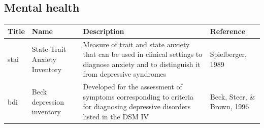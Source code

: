 \documentclass[]{book}
\begin{document}
\hypertarget{mental-health}{%
\subsection{Mental health}\label{mental-health}}

\begin{longtable}[]{@{}llll@{}}
\toprule
\begin{minipage}[b]{0.22\columnwidth}\raggedright
Title\strut
\end{minipage} & \begin{minipage}[b]{0.27\columnwidth}\raggedright
Name\strut
\end{minipage} & \begin{minipage}[b]{0.22\columnwidth}\raggedright
Description\strut
\end{minipage} & \begin{minipage}[b]{0.18\columnwidth}\raggedright
Reference\strut
\end{minipage}\tabularnewline
\midrule
\endhead
\begin{minipage}[t]{0.22\columnwidth}\raggedright
stai\strut
\end{minipage} & \begin{minipage}[t]{0.27\columnwidth}\raggedright
State-Trait Anxiety Inventory\strut
\end{minipage} & \begin{minipage}[t]{0.22\columnwidth}\raggedright
Measure of trait and state anxiety that can be used in clinical settings to diagnose anxiety and to distinguish it from depressive syndromes\strut
\end{minipage} & \begin{minipage}[t]{0.18\columnwidth}\raggedright
Spielberger, 1989\strut
\end{minipage}\tabularnewline
\begin{minipage}[t]{0.22\columnwidth}\raggedright
bdi\strut
\end{minipage} & \begin{minipage}[t]{0.27\columnwidth}\raggedright
Beck depression inventory\strut
\end{minipage} & \begin{minipage}[t]{0.22\columnwidth}\raggedright
Developed for the assessment of symptoms corresponding to criteria for diagnosing depressive disorders listed in the DSM IV\strut
\end{minipage} & \begin{minipage}[t]{0.18\columnwidth}\raggedright
Beck, Steer, \& Brown, 1996\strut
\end{minipage}\tabularnewline

\end{longtable}
\end{document}
